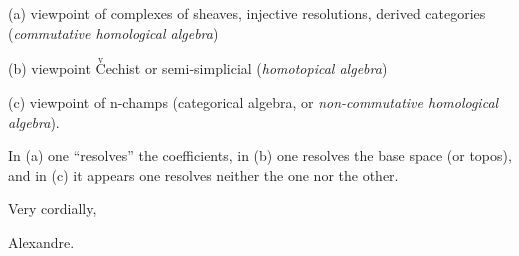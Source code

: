 \documentclass[10pt,oneside]{book}
\begin{document}
(a) viewpoint of complexes of sheaves, injective resolutions, derived
categories (\textit{commutative homological algebra})

(b) viewpoint $\overset{\mathrm v}{\mathrm C}$echist or semi-simplicial (\textit{homotopical algebra})

(c) viewpoint of n-champs (categorical algebra, or \textit{non-commutative homological
algebra}).

In (a) one ``resolves'' the coefficients, in (b) one resolves the base
space (or topos), and in (c) it appears one resolves neither the one nor the
other.

Very cordially,

Alexandre.

\end{document}
